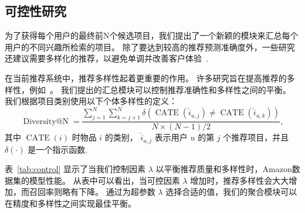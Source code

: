 \subsection{可控性研究}
\label{sec:control_study}
为了获得每个用户的最终前N个候选项目，我们提出了一个新颖的模块来汇总每个用户的不同兴趣所检索的项目。
除了要达到较高的推荐预测准确度外，一些研究还建议需要多样化的推荐，以避免单调并改善客户体验~\cite{gogna2017balancing,cheng2017learning}. 

在当前推荐系统中，推荐多样性起着更重要的作用。 许多研究旨在提高推荐的多样性，例如~\cite{bradley2001improving,qin2013promoting}。 我们提出的汇总模块可以控制推荐准确性和多样性之间的平衡。 我们根据项目类别使用以下个体多样性的定义：
\begin{equation}
    \operatorname{Diversity@N} = \frac{\sum_{j=1}^N \sum_{k=j+1}^N \delta(\operatorname{CATE}(\hat{i}_{u,j}) \neq \operatorname{CATE}(\hat{i}_{u,k}))}{N \times (N-1) / 2},
\end{equation}
\noindent 其中 $\operatorname{CATE}(i)$ 时物品 $i$ 的类别， $\hat{i}_{u,j}$ 表示用户 $u$ 的第 $j$ 个推荐项目，并且 $\delta(\cdot)$ 是一个指示函数. 

表~\ref{tab:control} 显示了当我们控制因素 $\lambda$ 以平衡推荐质量和多样性时，Amazon数据集的模型性能。 从表中可以看出，当可控因素 $\lambda$ 增加时，推荐多样性会大大增加，而召回率则略有下降。 通过为超参数 $\lambda$ 选择合适的值，我们的聚合模块可以在精度和多样性之间实现最佳平衡。




